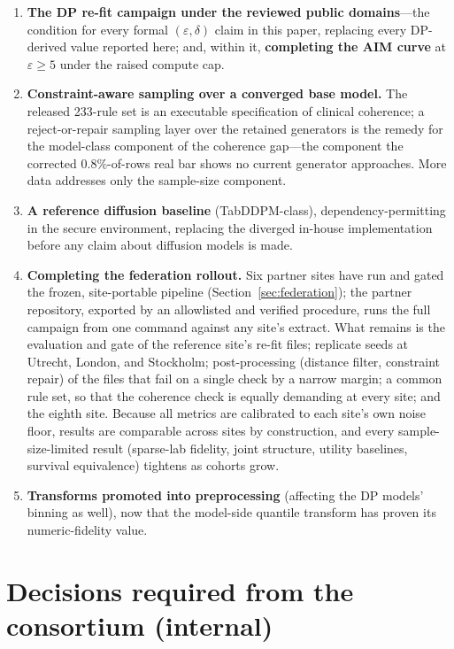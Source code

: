 \documentclass[11pt,a4paper]{article}
\newcommand{\eps}{\ensuremath{\varepsilon}}
\begin{document}
\begin{enumerate}
\item \textbf{The DP re-fit campaign under the reviewed public domains}---the
condition for every formal $(\eps, \delta)$ claim in this paper, replacing
every DP-derived value reported here; and, within it, \textbf{completing the AIM curve} at
$\eps \geq 5$ under the raised compute cap.
\item \textbf{Constraint-aware sampling over a converged base model.} The
released 233-rule set is an executable specification of clinical coherence; a
reject-or-repair sampling layer over the retained generators is the remedy for
the model-class component of the coherence gap---the component the corrected
0.8\%-of-rows real bar shows no current generator approaches. More data
addresses only the sample-size component.
\item \textbf{A reference diffusion baseline} (TabDDPM-class),
dependency-permitting in the secure environment, replacing the diverged in-house
implementation before any claim about diffusion models is made.
\item \textbf{Completing the federation rollout.} Six partner sites have run
and gated the frozen, site-portable pipeline (Section~\ref{sec:federation}); the
partner repository, exported by an allowlisted and verified procedure, runs the
full campaign from one command against any site's extract. What remains is the
evaluation and gate of the reference site's re-fit files; replicate seeds at
Utrecht, London, and Stockholm; post-processing (distance filter, constraint
repair) of the files that fail on a single check by a narrow margin; a common
rule set, so that the coherence check is equally demanding at every site; and
the eighth site. Because all metrics are calibrated to each site's own noise
floor, results are comparable across sites by construction, and every
sample-size-limited result (sparse-lab fidelity, joint structure, utility
baselines, survival equivalence) tightens as cohorts grow.
\item \textbf{Transforms promoted into preprocessing} (affecting the DP models'
binning as well), now that the model-side quantile transform has proven its
numeric-fidelity value.
\end{enumerate}

\section*{Decisions required from the consortium (internal)}
\end{document}
